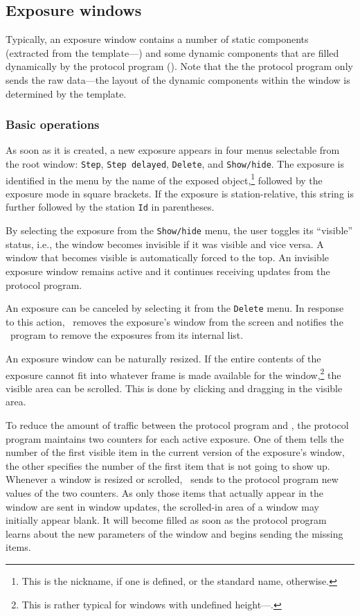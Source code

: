 \subsection{Exposure windows}
\label{rm_ds_wm}

Typically, an exposure window contains a number of static components
(extracted from the template---) and some
dynamic components that are
filled dynamically by the protocol program ().
Note that the the protocol program only sends the raw data---the layout of the
dynamic components within the window is determined by the template.

\subsubsection{Basic operations}
\label{rm_ds_wm_gc}

As soon as it is created, a new exposure appears in four menus selectable
from the root window: {\tt Step}, {\tt Step~delayed}, {\tt Delete},
and {\tt Show/hide}.
The exposure is identified in the menu by the name of the exposed
object,\footnote{This is the nickname, if one is defined, or
the standard name, otherwise.}
followed by the exposure mode in square brackets.
If the exposure is station-relative, this string is further followed by
the station {\tt Id} in parentheses.

By selecting the exposure from the {\tt Show/hide} menu, the user
toggles its ``visible'' status, i.e., the window becomes invisible if it
was visible and vice versa.
A window that becomes visible is automatically forced to the top.
An invisible exposure window remains active and it continues receiving
updates from the protocol program.

An exposure can be canceled by selecting it from the {\tt Delete} menu.
In response to this action, \dsd\ removes the exposure's window from the
screen and notifies the \smurph\ program to remove the exposures from its
internal list.

An exposure window can be naturally resized.
If the entire contents of the exposure cannot fit into whatever frame
is made available for the window,\footnote{This is rather typical for
windows with undefined height---.}
the visible area can be scrolled.
This is done by clicking and dragging in the visible area.

To reduce the amount of traffic between the protocol program and \dsd,
the protocol program maintains two counters for each active exposure.
One of them tells the number of the first visible item in the current
version of the exposure's window, the other specifies the number of the
first item that is not going to show up.
Whenever a window is resized or scrolled, \dsd\ sends to the protocol
program new values of the two counters.
As only those items that actually appear in the window are sent in
window updates,
the scrolled-in area of a window may initially appear blank.
It will become filled as soon as the protocol program learns about the
new parameters of the window and begins sending the missing items.

